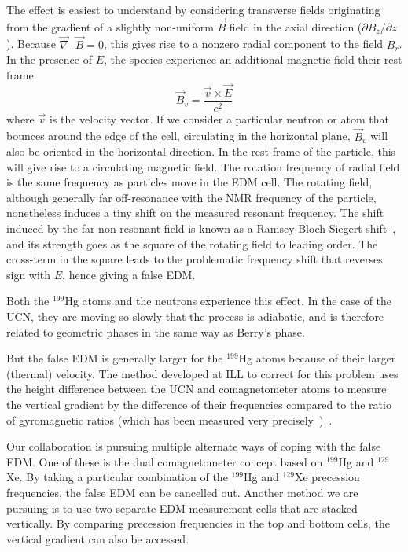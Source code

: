 The effect is easiest to understand by considering transverse fields
originating from the gradient of a slightly non-uniform $\vec{B}$
field in the axial direction ($\partial B_z/\partial z$).  Because
$\vec{\nabla}\cdot\vec{B}=0$, this gives rise to a nonzero radial
component to the field $B_r$.  In the presence of $E$, the species
experience an additional magnetic field their rest frame
\begin{equation}
  \vec{B}_v=\frac{\vec{v}\times\vec{E}}{c^2}
  \label{equation:phase effect}
\end{equation}
where $\vec{v}$ is the velocity vector.  If we consider a particular
neutron or atom that bounces around the edge of the cell, circulating
in the horizontal plane, $\vec{B}_v$ will also be oriented in the
horizontal direction.  In the rest frame of the particle, this will
give rise to a circulating magnetic field.  The rotation frequency of
radial field is the same frequency as particles move in the EDM cell.
The rotating field, although generally far off-resonance with the NMR
frequency of the particle, nonetheless induces a tiny shift on the
measured resonant frequency.  The shift induced by the far
non-resonant field is known as a Ramsey-Bloch-Siegert
shift~\cite{bib:ramsey,bib:bloch-siegert}, and its strength goes as
the square of the rotating field to leading order.  The cross-term in
the square leads to the problematic frequency shift that reverses sign
with $E$, hence giving a false EDM.

Both the $^{199}$Hg atoms and the neutrons experience this effect.  In
the case of the UCN, they are moving so slowly that the process is
adiabatic, and is therefore related to geometric phases in the same
way as Berry's phase.

But the false EDM is generally larger for the $^{199}$Hg atoms because
of their larger (thermal) velocity.  The method developed at ILL to
correct for this problem uses the height difference between the UCN
and comagnetometer atoms to measure the vertical gradient by the
difference of their frequencies compared to the ratio of gyromagnetic
ratios (which has been measured very
precisely~\cite{bib:gyro})~\cite{bib:baker,bib:pendlebury-revised}.

Our collaboration is pursuing multiple alternate ways of coping with
the false EDM.  One of these is the dual comagnetometer concept based
on $^{199}$Hg and $^{129}$Xe.  By taking a particular combination of
the $^{199}$Hg and $^{129}$Xe precession frequencies, the false EDM
can be cancelled out.  Another method we are pursuing is to use two
separate EDM measurement cells that are stacked vertically.  By
comparing precession frequencies in the top and bottom cells, the
vertical gradient can also be accessed.

